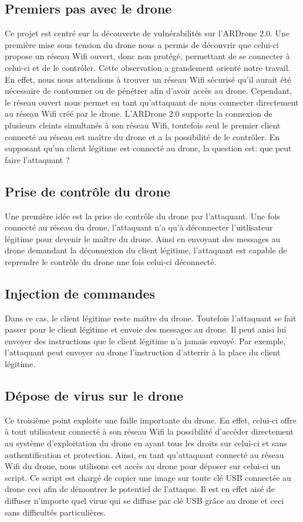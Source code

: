 \documentclass[a4paper,12pt]{report}
\begin{document}
\subsection{Premiers pas avec le drone}
Ce projet est centré sur la découverte de vulnérabilités sur l'ARDrone 2.0. Une première mise sous tension du drone nous a permis de découvrir que celui-ci propose un réseau Wifi ouvert, donc non protégé, permettant de se connecter à celui-ci et de le contrôler. Cette observation a grandement orienté notre travail. En effet, nous nous attendions à trouver un réseau Wifi sécurisé qu'il aurait été nécessaire de contourner ou de pénétrer afin d'avoir accès au drone. Cependant, le réseau ouvert nous permet en tant qu'attaquant de nous connecter directement au réseau Wifi créé par le drone. L'ARDrone 2.0 supporte la connexion de plusieurs cleints simultanés à son réseau Wifi, toutefois seul le premier client connecté au réseau est maître du drone et a la possibilité de le contrôler. En supposant qu'un client légitime est connecté au drone, la question est: que peut faire l'attaquant ?

\subsection{Prise de contrôle du drone}
Une première idée est la prise de contrôle du drone par l'attaquant. Une fois connecté au réseau du drone, l'attaquant n'a qu'à déconnecter l'uitlisateur légitime pour devenir le maître du drone. Ainsi en envoyant des messages au drone demandant la déconnexion du client légitime, l'attaquant est capable de reprendre le contrôle du drone une fois celui-ci déconnecté.

\subsection{Injection de commandes}
Dans ce cas, le client légitime reste maître du drone. Toutefois l'attaquant se fait passer pour le client légitime et envoie des messages au drone. Il peut anisi lui envoyer des instructions que le client légitime n'a jamais envoyé. Par exemple, l'attaquant peut envoyer au drone l'instruction d'atterrir à la place du client légitime.

\subsection{Dépose de virus sur le drone}
Ce troisième point exploite une faille importante du drone. En effet, celui-ci offre à tout utilisateur connecté à son réseau Wifi la possibilité d'accéder directement au système d'exploitation du drone en ayant tous les droits sur celui-ci et sans authentification et protection. Ainsi, en tant qu'attaquant connecté au réseau Wifi du drone, nous utilisons cet accès au drone pour déposer sur celui-ci un script. Ce script est chargé de copier une image sur toute clé USB connectée au drone ceci afin de démontrer le potentiel de l'attaque. Il est en effet aisé de diffuser n'importe quel virus qui se diffuse par clé USB grâce au drone et ceci sans difficultés particulières.
\end{document}
